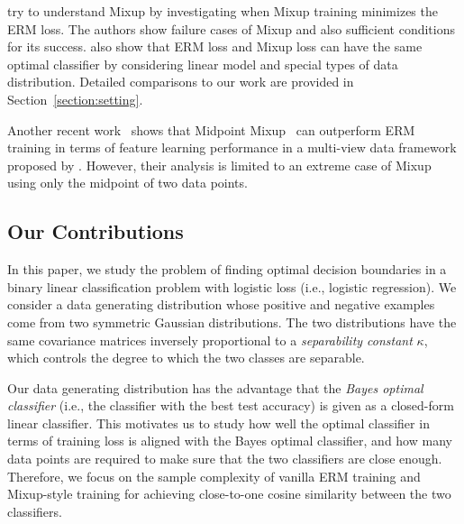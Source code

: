 \citet{chidambaram2021towards} try to understand Mixup by investigating when Mixup training minimizes the ERM loss. The authors show failure cases of Mixup and also sufficient conditions for its success. \citet{chidambaram2021towards} also show that ERM loss and Mixup loss can have the same optimal classifier by considering linear model and special types of data distribution. Detailed comparisons to our work are provided in Section~\ref{section:setting}.

Another recent work~\citep{chidambaram2022provably} shows that Midpoint Mixup~\citep{guo2021midpoint} can outperform ERM training in terms of feature learning performance in a multi-view data framework proposed by \citet{allen2020towards}. However, their analysis is limited to an extreme case of Mixup  using only the midpoint of two data points. 

\subsection{Our Contributions}

In this paper, we study the problem of finding optimal decision boundaries in a binary linear classification problem with logistic loss (i.e., logistic regression). We consider a data generating distribution whose positive and negative examples come from two symmetric Gaussian distributions. The two distributions have the same covariance matrices inversely proportional to a \emph{separability constant} $\kappa$, which controls the degree to which the two classes are separable.

Our data generating distribution has the advantage that the \emph{Bayes optimal classifier} (i.e., the classifier with the best test accuracy) is given as a closed-form linear classifier. This motivates us to study how well the optimal classifier in terms of training loss is aligned with the Bayes optimal classifier, and how many data points are required to make sure that the two classifiers are close enough. Therefore, we focus on the sample complexity of vanilla ERM training and Mixup-style training for achieving close-to-one cosine similarity between the two classifiers.

